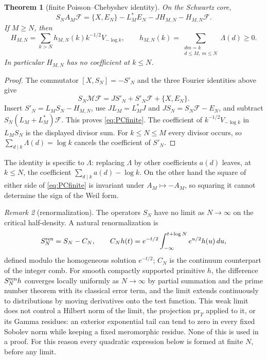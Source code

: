 \documentclass[11pt]{amsart}
\newtheorem{theorem}{Theorem}[section]
\theoremstyle{definition}
\theoremstyle{remark}
\newtheorem{remark}[theorem]{Remark}
\begin{document}
\begin{theorem}[finite Poisson--Chebyshev identity]\label{thm:PCfinite}
On the Schwartz core,
\begin{equation}\label{eq:PCfinite}
 S_NA_M\mathscr F
 =\{X,E_N\}-L_M^*E_N-JH_{M,N}-H_{M,N}\mathscr F.
\end{equation}
If $M\ge N$, then
\[
 H_{M,N}=\sum_{k>N}h_{M,N}(k)k^{-1/2}V_{-\log k},\qquad
 h_{M,N}(k)=\sum_{\substack{dm=k\\d\le M,\ m\le N}}\Lambda(d)\ge0.
\]
In particular $H_{M,N}$ has no coefficient at $k\le N$.
\end{theorem}
\begin{proof}
The commutator $[X,S_N]=-S'_N$ and the three Fourier identities above give
\[
 S_N\mathcal M\mathscr F=JS'_N+S'_N\mathscr F+\{X,E_N\}.
\]
Insert $S'_N=L_MS_N-H_{M,N}$, use $JL_M=L_M^*J$ and
$JS_N=S_N\mathscr F-E_N$, and subtract $S_N(L_M+L_M^*)\mathscr F$.
This proves \eqref{eq:PCfinite}. The coefficient of
$k^{-1/2}V_{-\log k}$ in $L_MS_N$ is the displayed divisor sum. For
$k\le N\le M$ every divisor occurs, so $\sum_{d\mid k}\Lambda(d)=\log k$ cancels the
coefficient of $S'_N$.
\end{proof}

The identity is specific to $\Lambda$: replacing $\Lambda$ by other coefficients $a(d)$ leaves, at
$k\le N$, the coefficient $\sum_{d\mid k}a(d)-\log k$. On the other hand the square of either side
of \eqref{eq:PCfinite} is invariant under $A_M\mapsto-A_M$, so squaring it cannot determine the sign
of the Weil form.

\begin{remark}[renormalization]\label{rem:Sren}
The operators $S_N$ have no limit as $N\to\infty$ on the critical half-density. A natural renormalization is
\[
 S_N^{\rm ren}=S_N-C_N,\qquad C_Nh(t)=e^{-t/2}\int_{-\infty}^{t+\log N}e^{u/2}h(u)\,du ,
\]
defined modulo the homogeneous solution $e^{-t/2}$; $C_N$ is the continuum counterpart of the integer comb. For
smooth compactly supported primitive $h$, the difference $S_N^{\rm ren}h$ converges locally uniformly as $N\to\infty$ by
partial summation and the prime number theorem with its classical error term, and the limit extends continuously to
distributions by moving derivatives onto the test function. This weak limit does not control a Hilbert norm of the
limit, the projection $\mathrm{pr}_T$ applied to it, or its Gamma residues: an exterior exponential tail can tend to zero
in every fixed Sobolev norm while keeping a fixed meromorphic residue. None of this is used in a proof. For this reason every quadratic expression
below is formed at finite $N$, before any limit.
\end{remark}
\end{document}
